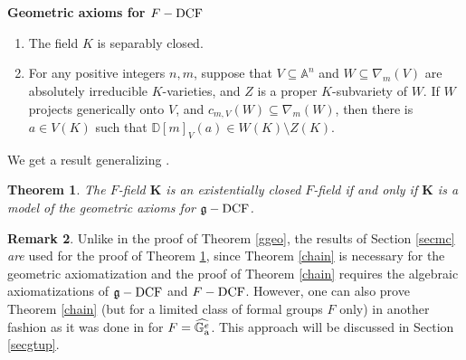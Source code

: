 \documentclass[10pt]{amsart}
\newtheorem{theorem}{Theorem}[section]
\theoremstyle{definition}
\newtheorem{remark}[theorem]{Remark}
\begin{document}
\\
\\
{\bf Geometric axioms for $F-\operatorname{DCF}$}
\begin{enumerate}
\item The field $K$ is separably closed.

\item For any positive integers $n,m$, suppose that $V\subseteq {\mathbb A}^n$ and $W\subseteq \nabla_m(V)$ are
absolutely irreducible $K$-varieties, and $Z$ is a proper $K$-subvariety
of $W$. If $W$ projects generically onto $V$, and $c_{m,V}(W)\subseteq
\nabla_m(W)$, then there is $a\in V(K)$ such that $\mathbb{D}[m]_{V}(a)\in W(K)\setminus Z(K)$.
\end{enumerate}
\noindent
We get a result generalizing \cite[Theorem 4.3]{K3}.
\begin{theorem}\label{fgeo}
The $F$-field $\mathbf{K}$ is an existentially
closed $F$-field if and only if $\mathbf{K}$ is a model of the geometric axioms for $\mathfrak{g}-\operatorname{DCF}$.
\end{theorem}
\begin{remark}\label{fremark}
Unlike in the proof of Theorem \ref{ggeo}, the results of Section \ref{secmc} \emph{are} used for the proof of Theorem \ref{fgeo}, since Theorem \ref{chain} is necessary for the geometric axiomatization and the proof of Theorem \ref{chain} requires the algebraic axiomatizations of $\mathfrak{g}-\operatorname{DCF}$ and $F-\operatorname{DCF}$. However, one can also prove Theorem \ref{chain} (but for a limited class of formal groups $F$ only) in another fashion as it was done in \cite{K3} for $F=\widehat{\mathbb{G}_{\rm{a}}^e}$. This approach will be discussed in Section \ref{secgtup}.
\end{remark}
\end{document}
